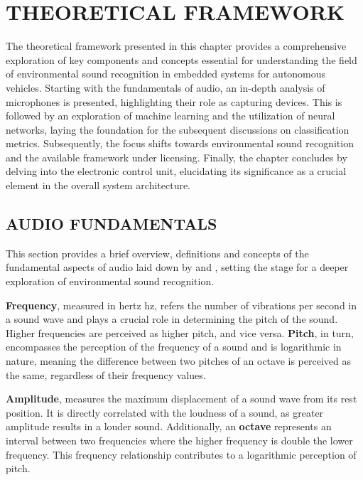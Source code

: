 \chapter{THEORETICAL FRAMEWORK}
\label{chp:frmwk}

The theoretical framework presented in this chapter provides a comprehensive exploration of key components and concepts essential for understanding the field of environmental sound recognition in embedded systems for autonomous vehicles. Starting with the fundamentals of audio, an in-depth analysis of microphones is presented, highlighting their role as capturing devices. This is followed by an exploration of machine learning and the utilization of neural networks, laying the foundation for the subsequent discussions on classification metrics. Subsequently, the focus shifts towards environmental sound recognition and the available framework under licensing. Finally, the chapter concludes by delving into the electronic control unit, elucidating its significance as a crucial element in the overall system architecture. 


\section{AUDIO FUNDAMENTALS}
\label{sec:frmwk_audio_fund}

This section provides a brief overview, definitions and concepts of the fundamental aspects of audio laid down by \textcite{Mueller2016} and \textcite{Pelgrom2018}, setting the stage for a deeper exploration of environmental sound recognition.

\textbf{Frequency}, measured in hertz \gls{hz}, refers the number of vibrations per second in a sound wave and plays a crucial role in determining the pitch of the sound. Higher frequencies are perceived as higher pitch, and vice versa. \textbf{Pitch}, in turn, encompasses the perception of the frequency of a sound and is logarithmic in nature, meaning the difference between two pitches of an octave is perceived as the same, regardless of their frequency values.

\textbf{Amplitude}, measures the maximum displacement of a sound wave from its rest position. It is directly correlated with the loudness of a sound, as greater amplitude results in a louder sound. Additionally, an \textbf{octave} represents an interval between two frequencies where the higher frequency is double the lower frequency. This frequency relationship contributes to a logarithmic perception of pitch.

